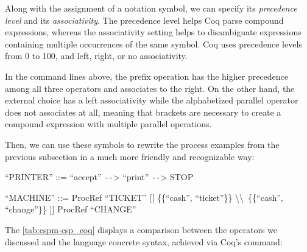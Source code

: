 Along with the assignment of a notation symbol, we can specify its \emph{precedence level} and its \emph{associativity}. The precedence level helps Coq parse compound expressions, whereas the associativity setting helps to disambiguate expressions containing multiple occurrences of the same symbol. Coq uses precedence levels from 0 to 100, and left, right, or no associativity.

In the command lines above, the prefix operation has the higher precedence among all three operators and associates to the right. On the other hand, the external choice has a left associativity while the alphabetized parallel operator does not associates at all, meaning that brackets are necessary to create a compound expression with multiple parallel operations.

Then, we can use these symbols to rewrite the process examples from the previous subsection in a much more friendly and recognizable way:

\begin{flushleft}
	``PRINTER'' ::= ``accept'' \texttt{-{}-}> ``print'' \texttt{-{}-}> STOP

	``MACHINE'' ::= ProcRef ``TICKET'' [[ \{\{``cash'', ``ticket''\}\} \textbackslash\textbackslash \ \{\{``cash'', ``change''\}\} ]] ProcRef ``CHANGE''
\end{flushleft}

The \autoref{tab:cspm-csp_coq} displays a comparison between the \CSPM{} operators we discussed and the \CSPcoq{} language concrete syntax, achieved via Coq's  command:

